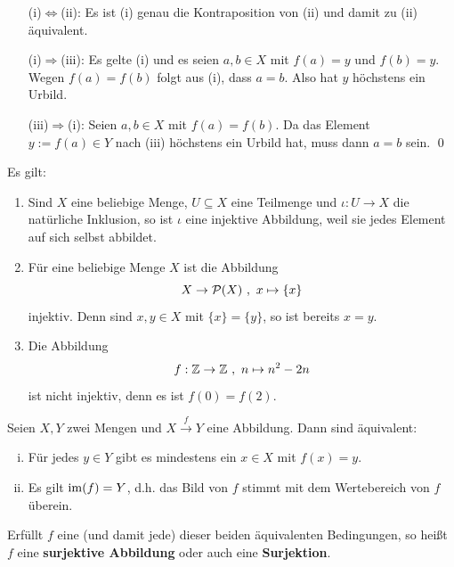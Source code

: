 \begin{bew} \quad
    \begin{itemize}
        \item[(i)$\Leftrightarrow$(ii):] Es ist (i) genau die Kontraposition von (ii) und damit zu (ii) äquivalent.
        \item[(i)$\Rightarrow$(iii):] Es gelte (i) und es seien $a,b\in X$ mit $f(a)=y$ und $f(b)=y$. Wegen $f(a)=f(b)$ folgt aus (i), dass $a=b$. Also hat $y$ höchstens ein Urbild.
        \item[(iii)$\Rightarrow$(i):] Seien $a,b\in X$ mit $f(a)=f(b)$. Da das Element $y:=f(a)\in Y$ nach (iii) höchstens ein Urbild hat, muss dann $a=b$ sein. \qed
    \end{itemize}
\end{bew}


\begin{bsp} Es gilt:
    \begin{enumerate}
        \item Sind $X$ eine beliebige Menge, $U\subseteq X$ eine Teilmenge und $\iota : U\to X$ die natürliche Inklusion, so ist $\iota$ eine injektive Abbildung, weil sie jedes Element auf sich selbst abbildet.
        \item Für eine beliebige Menge $X$ ist die Abbildung
            \[ X \to \mathcal P(X) \ ,\ x \mapsto \{x\} \]
        injektiv. Denn sind $x,y\in X$ mit $\{x\}=\{y\}$, so ist bereits $x=y$.
        \item Die Abbildung
            \[ f:\mathbb Z \to \mathbb Z \ ,\ n \mapsto n^2-2n \]
        ist nicht injektiv, denn es ist $f(0)=f(2)$.
    \end{enumerate}
\end{bsp}
	

\begin{de} \label{def:surjektiv} 
    Seien $X,Y$ zwei Mengen und $X \xrightarrow{f} Y$ eine Abbildung. Dann sind äquivalent:
    \begin{enumerate}[(i)]
        \item Für jedes $y\in Y$ gibt es mindestens ein $x\in X$ mit $f(x)=y$.
        \item Es gilt $\operatorname{im}(f) = Y$, d.h. das Bild von $f$ stimmt mit dem Wertebereich von $f$ überein.
    \end{enumerate}
    Erfüllt $f$ eine (und damit jede) dieser beiden äquivalenten Bedingungen, so heißt $f$ eine \textbf{surjektive Abbildung} oder auch eine \textbf{Surjektion}.
\end{de}



